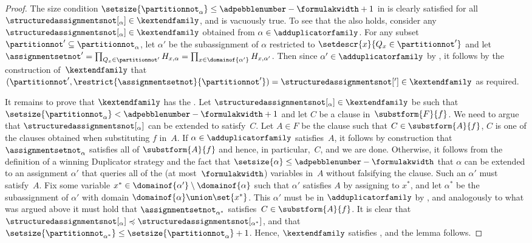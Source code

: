\begin{proof}
  The size condition
  $\setsize{\partitionnot_\alpha} \leq  \adpebblenumber - \formulakwidth + 1$ 
  in
  is clearly satisfied for all
  $\structuredassignmentsnot[_\alpha] \in \kextendfamily$, 
  and \respectfulness is vacuously true.
  To see that the \restrictionproperty{} also holds,
%
%
%
  consider any
  \mbox{$\structuredassignmentsnot[_\alpha] \in \kextendfamily$} 
  obtained from $\alpha \in \adduplicatorfamily$.
  For any subset 
  $\partitionnot' \subseteq \partitionnot_\alpha$, 
  let
  $\alpha'$
  be the subassignment of 
  $\alpha$
  restricted to 
  $\setdescr{x}{Q_x \in \partitionnot'}$
%
  and let
  $
  \assignmentsetnot' = 
  \prod_{Q_x \in \partitionnot'} H_{x,\alpha} =
  \prod_{x \in \domainof{\alpha'}} H_{x,\alpha'}
  $.
  Then since
  $\alpha' \in \adduplicatorfamily$
  by
 ,  
  it follows by the construction of~$\kextendfamily$
  that
  $
  (\partitionnot', \restrict{\assignmentsetnot}{\partitionnot'})
  =
  \structuredassignmentsnot[']
  \in
  \kextendfamily$
  as required.
%
%
%
%
%
%
%
%
%
%
%
%


  It 
%
  remains to prove that $\kextendfamily$ has the
  \extensionproperty{}. 
%
%
%
%
%
%
%
  Let $\structuredassignmentsnot[_\alpha] \in \kextendfamily$ be 
  such that
  $\setsize{\partitionnot_\alpha} < \adpebblenumber - \formulakwidth + 1$ 
  and
%
  let 
  $C$ be a clause in~$\substform{F}{f}$.
  We need to argue that 
  $\structuredassignmentsnot[_\alpha]$
  can be extended to satisfy~$C$.
%
  Let 
  $A \in F$
  be the clause such that
  $C \in \substform{A}{f}$,
  \ieComma $C$ is one of the clauses
  obtained when substituting
%
  $f$ in~$A$. 
  If
  $\alpha \in \adduplicatorfamily$ 
  satisfies~$A$, it follows by construction that 
  $\assignmentsetnot_\alpha$
  satisfies all of 
  $\substform{A}{f}$ 
  and hence, in particular,~$C$, and we are done.
  Otherwise, 
%
%
%
%
%
%
%
%
  it follows
  from the definition 
  of a winning Duplicator strategy and the
  fact that $\setsize{\alpha} \leq \adpebblenumber - \formulakwidth$
  that $\alpha$ can be extended to an assignment $\alpha'$
%
%
%
  that queries all of the (at most~$\formulakwidth$) variables in~$A$ 
  without falsifying the clause. Such an $\alpha'$ must satisfy~$A$.
  Fix some variable
  $x^* \in \domainof{\alpha'} \setminus \domainof{\alpha}$
  such that $\alpha'$ satisfies $A$ by assigning to $x^*$,
  and let
  $\alpha^*$ be the subassignment of $\alpha'$
  with domain
  $\domainof{\alpha} \union \set{x^*}$.
%
%
%
%
%
%
%
%
%
%
%
%
%
%
%
  This $\alpha'$ must be in $\adduplicatorfamily$ by
 ,  
  and analogously to what was argued above it must hold that
  $\assignmentsetnot_{\alpha^*}$
  satisfies~$C \in \substform{A}{f}$.
  It is clear that
  $\structuredassignmentsnot[_{\alpha}] 
  \preccurlyeq 
  \structuredassignmentsnot[_{\alpha^*}]$,
  and that
  $\setsize{\partitionnot_{\alpha^*}} \leq
  \setsize{\partitionnot_\alpha} + 1$.
  Hence, 
  $\kextendfamily$ satisfies
  \extensionpropname, and the lemma follows.
\end{proof}

